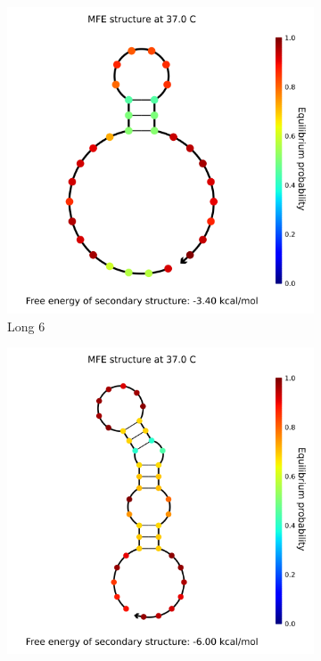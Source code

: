 \begin{figure}[h]
\begin{subfigure}{.32\columnwidth}
  \centering
  \includegraphics[width=\linewidth]{images/long_rna_secondarystructure_6.png}
  \caption{Long 6}
\end{subfigure}%
\begin{subfigure}{.32\columnwidth}
  \centering
  \includegraphics[width=\linewidth]{images/long_rna_secondarystructure_7.png}

\end{subfigure}
\end{figure}
